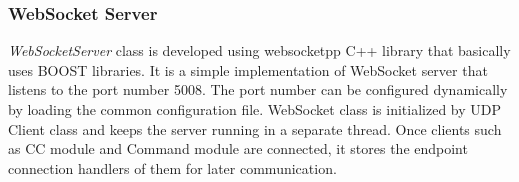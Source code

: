 \subsubsection{WebSocket Server} \textit{WebSocketServer} class is developed using websocketpp C++ library that basically uses BOOST libraries. It is a simple implementation of WebSocket server that listens to the port number 5008. The port number can be configured dynamically by loading the common configuration file. WebSocket class is initialized by UDP Client class and keeps the server running in a separate thread. Once clients such as CC module and Command module are connected, it stores the endpoint connection handlers of them for later communication. 
